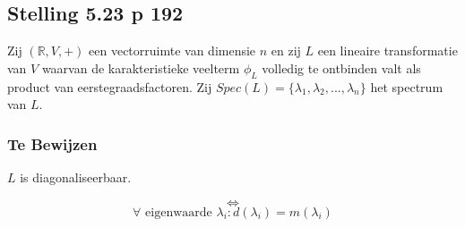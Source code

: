 \documentclass[lineaire_algebra_oplossingen.tex]{subfiles}
\begin{document}
\subsection{Stelling 5.23 p 192}
\label{5.23}
Zij $(\mathbb{R},V,+)$ een vectorruimte van dimensie $n$ en zij $L$ een lineaire transformatie van $V$ waarvan de karakteristieke veelterm $\phi_L$ volledig te ontbinden valt als product van eerstegraadsfactoren. Zij $Spec(L) = \{\lambda_1,\lambda_2,...,\lambda_n\}$ het spectrum van $L$.

\subsubsection*{Te Bewijzen}
\begin{center}
$L$ is diagonaliseerbaar.
\end{center}
\[\Leftrightarrow\]
\[
\forall \text{ eigenwaarde } \lambda_i: d(\lambda_i) = m(\lambda_i)
\]
\end{document}
